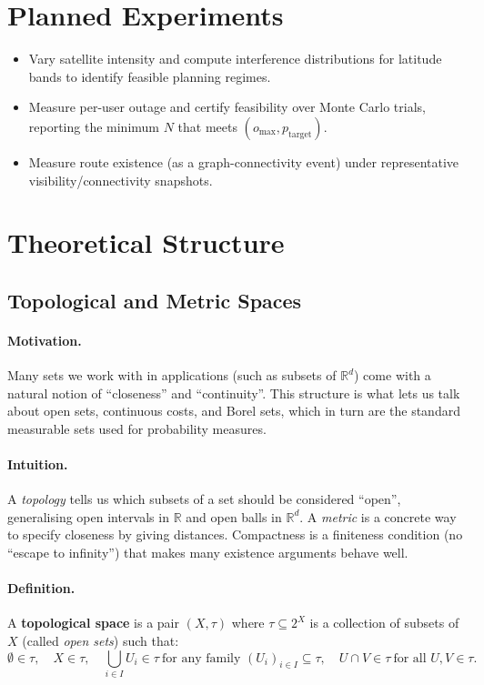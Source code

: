 \section{Planned Experiments}
\begin{itemize}
    \item Vary satellite intensity and compute interference distributions for
    latitude bands to identify feasible planning regimes.
    \item Measure per-user outage and certify feasibility over Monte Carlo trials,
    reporting the minimum $N$ that meets $(o_{\max}, p_{\mathrm{target}})$.
    \item Measure route existence (as a graph-connectivity event) under representative visibility/connectivity snapshots.
\end{itemize}



\section{Theoretical Structure}

\subsection{Topological and Metric Spaces}

\paragraph{Motivation.}
Many sets we work with in applications (such as subsets of $\mathbb{R}^d$) come with a natural notion of
``closeness'' and ``continuity''. This structure is what lets us talk about open sets, continuous costs, and Borel sets,
which in turn are the standard measurable sets used for probability measures.

\paragraph{Intuition.}
A \emph{topology} tells us which subsets of a set should be considered ``open'', generalising open intervals in
$\mathbb{R}$ and open balls in $\mathbb{R}^d$. A \emph{metric} is a concrete way to specify closeness by giving distances.
Compactness is a finiteness condition (no ``escape to infinity'') that makes many existence arguments behave well.

\paragraph{Definition.}
A \textbf{topological space} is a pair $(X,\tau)$ where $\tau\subseteq 2^X$ is a collection of subsets of $X$ (called
\emph{open sets}) such that:
$$
\emptyset\in\tau,\quad X\in\tau,\quad
\bigcup_{i\in I} U_i \in\tau\ \text{for any family }(U_i)_{i\in I}\subseteq\tau,\quad
U\cap V\in\tau\ \text{for all }U,V\in\tau.
$$

